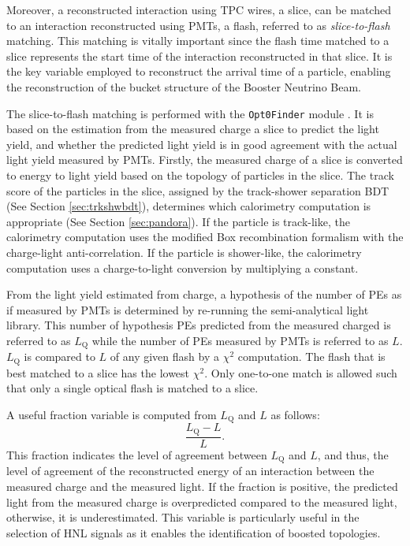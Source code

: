 Moreover, a reconstructed interaction using TPC wires, a slice, can be matched to an interaction reconstructed using PMTs, a flash, referred to as \textit{slice-to-flash} matching.
This matching is vitally important since the flash time matched to a slice represents the start time of the interaction reconstructed in that slice.
It is the key variable employed to reconstruct the arrival time of a particle, enabling the reconstruction of the bucket structure of the Booster Neutrino Beam.

The slice-to-flash matching is performed with the \texttt{Opt0Finder} module \cite{opt0finder_module}.
It is based on the estimation from the measured charge a slice to predict the light yield, and whether the predicted light yield is in good agreement with the actual light yield measured by PMTs.
Firstly, the measured charge of a slice is converted to energy to light yield based on the topology of particles in the slice.
The track score of the particles in the slice, assigned by the track-shower separation BDT (See Section \ref{sec:trkshwbdt}), determines which calorimetry computation is appropriate (See Section \ref{sec:pandora}).
If the particle is track-like, the calorimetry computation uses the modified Box recombination formalism with the charge-light anti-correlation. 
If the particle is shower-like, the calorimetry computation uses a charge-to-light conversion by multiplying a constant.     

From the light yield estimated from charge, a hypothesis of the number of PEs as if measured by PMTs is determined by re-running the semi-analytical light library.
This number of hypothesis PEs predicted from the measured charged is referred to as $L_{\mathrm{Q}}$ while the number of PEs measured by PMTs is referred to as $L$.
$L_{\mathrm{Q}}$ is compared to $L$ of any given flash by a $\chi^2$ computation.
The flash that is best matched to a slice has the lowest $\chi^2$.
Only one-to-one match is allowed such that only a single optical flash is matched to a slice.

A useful fraction variable is computed from $L_{\mathrm{Q}}$ and $L$ as follows:
\begin{equation}
\label{eq:opt0fraction}
        \frac{L_{\mathrm{Q}} - L}{L}.
\end{equation}
This fraction indicates the level of agreement between $L_{\mathrm{Q}}$ and $L$, and thus, the level of agreement of the reconstructed energy of an interaction between the measured charge and the measured light.
If the fraction is positive, the predicted light from the measured charge is overpredicted compared to the measured light, otherwise, it is underestimated.
This variable is particularly useful in the selection of HNL signals as it enables the identification of boosted topologies.

